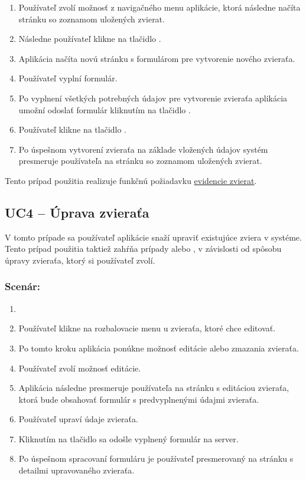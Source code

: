 \begin{enumerate}
	\item Používateľ zvolí možnosť  z navigačného menu aplikácie, ktorá následne načíta stránku so zoznamom uložených zvierat.
	\item Následne používateľ klikne na tlačidlo .
	\item Aplikácia načíta novú stránku s formulárom pre vytvorenie nového zvieraťa.
	\item Používateľ vyplní formulár.
	\item Po vyplnení všetkých potrebných údajov pre vytvorenie zvieraťa aplikácia umožní odoslať formulár kliknutím na tlačidlo .
	\item Používateľ klikne na tlačidlo .
	\item Po úspešnom vytvorení zvieraťa na základe vložených údajov systém presmeruje používateľa na stránku so zoznamom uložených zvierat.
\end{enumerate}

Tento prípad použitia realizuje funkčnú požiadavku \hyperref[evidencia-zvierat]{evidencie zvierat}.

\subsection*{UC4 -- Úprava zvieraťa}

V tomto prípade sa používateľ aplikácie snaží upraviť existujúce zviera v systéme. Tento prípad použitia taktiež zahŕňa prípady 
 alebo , v závislosti od spôsobu úpravy zvieraťa, ktorý si používateľ zvolí.

\subsubsection*{Scenár:}

\begin{enumerate}
	\item {}
	\item Používateľ klikne na rozbalovacie menu u zvieraťa, ktoré chce editovať.
	\item Po tomto kroku aplikácia ponúkne možnosť editácie alebo zmazania zvieraťa.
	\item Používateľ zvolí možnosť editácie.
	\item Aplikácia následne presmeruje používateľa na stránku s editáciou zvieraťa, ktorá bude obsahovať formulár s predvyplnenými údajmi zvieraťa.
	\item Používateľ upraví údaje zvieraťa.
	\item Kliknutím na tlačidlo  sa odošle vyplnený formulár na server.
	\item Po úspešnom spracovaní formuláru je používateľ presmerovaný na stránku s detailmi upravovaného zvieraťa.
\end{enumerate}

